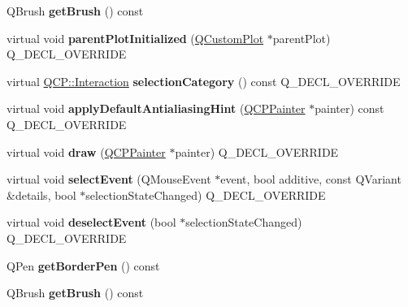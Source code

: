 \begin{DoxyCompactItemize}
\mbox{\label{class_q_c_p_legend_ab1438d5d67304cdda3b9339da580d6bc}} 
Q\+Brush {\bfseries get\+Brush} () const
\item 
\mbox{\label{class_q_c_p_legend_a1caa526110fb4ad1185f05e3da7868f1}} 
virtual void {\bfseries parent\+Plot\+Initialized} (\hyperlink{class_q_custom_plot}{Q\+Custom\+Plot} $\ast$parent\+Plot) Q\+\_\+\+D\+E\+C\+L\+\_\+\+O\+V\+E\+R\+R\+I\+DE
\item 
\mbox{\label{class_q_c_p_legend_a7f99bba4e7e859aa4d7753e4a59f34d6}} 
virtual \hyperlink{namespace_q_c_p_a2ad6bb6281c7c2d593d4277b44c2b037}{Q\+C\+P\+::\+Interaction} {\bfseries selection\+Category} () const Q\+\_\+\+D\+E\+C\+L\+\_\+\+O\+V\+E\+R\+R\+I\+DE
\item 
\mbox{\label{class_q_c_p_legend_a4d86ae7bb18e806c71f9b565ac83cc5f}} 
virtual void {\bfseries apply\+Default\+Antialiasing\+Hint} (\hyperlink{class_q_c_p_painter}{Q\+C\+P\+Painter} $\ast$painter) const Q\+\_\+\+D\+E\+C\+L\+\_\+\+O\+V\+E\+R\+R\+I\+DE
\item 
\mbox{\label{class_q_c_p_legend_acb52527b4acbff7232f1c1329e9aef86}} 
virtual void {\bfseries draw} (\hyperlink{class_q_c_p_painter}{Q\+C\+P\+Painter} $\ast$painter) Q\+\_\+\+D\+E\+C\+L\+\_\+\+O\+V\+E\+R\+R\+I\+DE
\item 
\mbox{\label{class_q_c_p_legend_af69d7d31a34de5ddb0a7e31d27711d11}} 
virtual void {\bfseries select\+Event} (Q\+Mouse\+Event $\ast$event, bool additive, const Q\+Variant \&details, bool $\ast$selection\+State\+Changed) Q\+\_\+\+D\+E\+C\+L\+\_\+\+O\+V\+E\+R\+R\+I\+DE
\item 
\mbox{\label{class_q_c_p_legend_af60408f3fa131f950177249ed1eff2a4}} 
virtual void {\bfseries deselect\+Event} (bool $\ast$selection\+State\+Changed) Q\+\_\+\+D\+E\+C\+L\+\_\+\+O\+V\+E\+R\+R\+I\+DE
\item 
\mbox{\label{class_q_c_p_legend_a1cf9df6f2130c5ad842dc92188ab6bd7}} 
Q\+Pen {\bfseries get\+Border\+Pen} () const
\item 
\mbox{\label{class_q_c_p_legend_ab1438d5d67304cdda3b9339da580d6bc}} 
Q\+Brush {\bfseries get\+Brush} () const
\end{DoxyCompactItemize}
